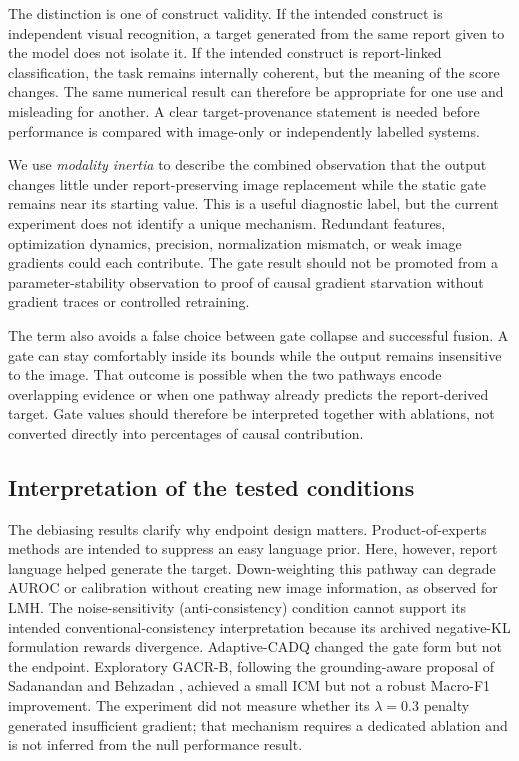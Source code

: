 \documentclass[10pt,a4paper,twocolumn]{article}
\begin{document}
The distinction is one of construct validity. If the intended construct is
independent visual recognition, a target generated from the same report given
to the model does not isolate it. If the intended construct is report-linked
classification, the task remains internally coherent, but the meaning of the
score changes. The same numerical result can therefore be appropriate for one
use and misleading for another. A clear target-provenance statement is needed
before performance is compared with image-only or independently labelled
systems.

We use \emph{modality inertia} to describe the combined observation that the
output changes little under report-preserving image replacement while the
static gate remains near its starting value. This is a useful diagnostic label,
but the current experiment does not identify a unique mechanism. Redundant
features, optimization dynamics, precision, normalization mismatch, or weak
image gradients could each contribute. The gate result should not be promoted
from a parameter-stability observation to proof of causal gradient starvation
without gradient traces or controlled retraining.

The term also avoids a false choice between gate collapse and successful
fusion. A gate can stay comfortably inside its bounds while the output remains
insensitive to the image. That outcome is possible when the two pathways encode
overlapping evidence or when one pathway already predicts the report-derived
target. Gate values should therefore be interpreted together with ablations,
not converted directly into percentages of causal contribution.

\subsection{Interpretation of the tested conditions}\label{sec:variants}

The debiasing results clarify why endpoint design matters. Product-of-experts
methods are intended to suppress an easy language prior. Here, however, report
language helped generate the target. Down-weighting this pathway can degrade
AUROC or calibration without creating new image information, as observed for
LMH. The noise-sensitivity (anti-consistency) condition cannot support its
intended conventional-consistency interpretation because its archived
negative-KL formulation rewards divergence. Adaptive-CADQ changed the gate form
but not the endpoint. Exploratory GACR-B, following the grounding-aware
proposal of Sadanandan and Behzadan
\cite{sadanandan2026consistentdangerous}, achieved a small ICM but not a robust
Macro-F1 improvement. The experiment did not measure whether its $\lambda=0.3$
penalty generated insufficient gradient; that mechanism requires a dedicated
ablation and is not inferred from the null performance result.
\end{document}
